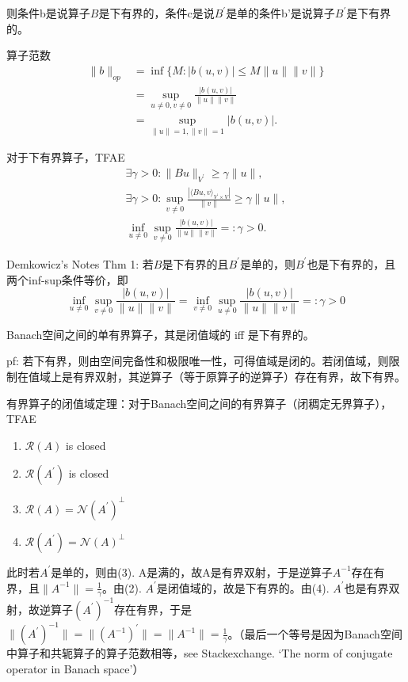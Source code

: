 则条件b是说算子$B$是下有界的，条件c是说$B^\prime$是单的条件b'是说算子$B^\prime$是下有界的。

算子范数
\[
  \begin{aligned}
    \| b \|_{op} & =\inf \{M:|b(u, v)| \le M\|u\|\|v\|\} \\
    & =\sup_{u \neq 0, v \neq 0} \frac{|b(u, v)|}{\|u\|\|v\|} \\
    & =\sup_{\|u\|=1,\|v\|=1}|b(u, v)| .
  \end{aligned}
\]

对于下有界算子，TFAE
\[
  \begin{array}{c} 
    \exists \gamma>0: \|B u\|_{V^{\prime}} \geq \gamma\|u\|, \\
    \exists \gamma>0: \sup_{v \neq 0} \frac{|\langle B u, v \rangle_{V^\prime \times V}|}{\|v\|} \geq \gamma\|u\|, \\
    \inf _{u \neq 0} \sup _{v \neq 0} \frac{|b(u, v)|}{\|u\|\|v\|}=: \gamma>0 .
  \end{array}
\]

Demkowicz's Notes Thm 1: 若$B$是下有界的且$B^\prime$是单的，则$B^\prime$也是下有界的，且两个inf-sup条件等价，即
\[
  \inf_{u \neq 0} \sup_{v \neq 0} \frac{|b(u, v)|}{\|u\|\|v\|}=\inf_{v \neq 0} \sup_{u \neq 0} \frac{|b(u, v)|}{\|u\|\|v\|}=:\gamma>0
\]

Banach空间之间的单有界算子，其是闭值域的 iff 是下有界的。

pf: 若下有界，则由空间完备性和极限唯一性，可得值域是闭的。若闭值域，则限制在值域上是有界双射，其逆算子（等于原算子的逆算子）存在有界，故下有界。

有界算子的闭值域定理：对于Banach空间之间的有界算子（闭稠定无界算子），TFAE
\begin{enumerate}
  \item $\mathcal{R}(A)$ is closed
  \item $\mathcal{R}(A^{\prime})$ is closed
  \item $\mathcal{R}(A)=\mathcal{N}(A^{\prime})^{\perp}$
  \item $\mathcal{R}(A^{\prime})=\mathcal{N}(A)^{\perp}$ 
\end{enumerate}

此时若$A^\prime$是单的，则由(3). A是满的，故A是有界双射，于是逆算子$A^{-1}$存在有界，且$\|A^{-1}\| = \frac{1}{\gamma}$。由(2). $A^\prime$是闭值域的，故是下有界的。由(4). $A^\prime$也是有界双射，故逆算子$(A^\prime)^{-1}$存在有界，于是$\|(A^\prime)^{-1}\| = \|(A^{-1})^{\prime}\| = \|A^{-1}\| = \frac{1}{\gamma}$。（最后一个等号是因为Banach空间中算子和共轭算子的算子范数相等，see Stackexchange. `The norm of conjugate operator in Banach space'）

